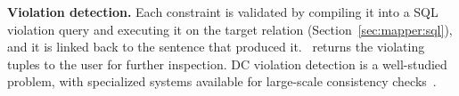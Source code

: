 \smallskip\noindent\textbf{Violation detection.}
Each constraint is validated by compiling it into a SQL violation query and executing it on the target relation (Section~\ref{sec:mapper:sql}), and it is linked back to the sentence that produced it. \system\ returns the violating tuples to the user for further inspection. DC violation detection is a well-studied problem, with specialized systems available for large-scale consistency checks~\cite{facet2021,liu2024rapidash,youri2024}. 


